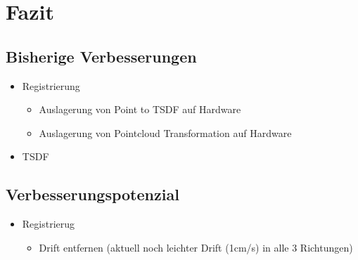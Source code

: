 \documentclass{beamer}
\begin{document}
\section{Fazit}
\begin{frame}{}
\begin{center}
\end{center}
\end{frame}

\subsection{Bisherige Verbesserungen}
\begin{frame}{\subsecname}
\begin{itemize}
\item{Registrierung}
\begin{itemize}
\item{Auslagerung von Point to TSDF auf Hardware}
\item{Auslagerung von Pointcloud Transformation auf Hardware}
\end{itemize}
\item{TSDF}
\end{itemize}
\end{frame}

\subsection{Verbesserungspotenzial}
\begin{frame}{\subsecname}
\begin{itemize}
\item{Registrierug}
\begin{itemize}
\item{Drift entfernen (aktuell noch leichter Drift (1cm/s) in alle 3 Richtungen)}
\end{itemize}
\end{itemize}
\end{frame}
\end{document}
